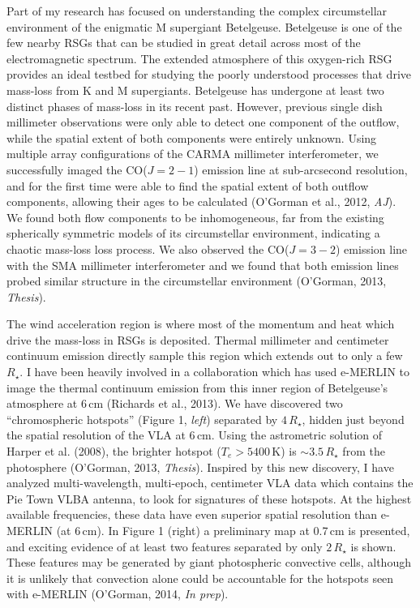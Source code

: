 \documentclass[11pt]{letter} %
\begin{document}
Part of my research has focused on understanding the complex circumstellar environment of the enigmatic M supergiant Betelgeuse. Betelgeuse is one of the few nearby RSGs that can be studied in great detail across most of the electromagnetic spectrum. The extended atmosphere of this oxygen-rich RSG provides an ideal testbed for studying the poorly understood processes that drive mass-loss from K and M supergiants. Betelgeuse has undergone at least two distinct phases of mass-loss in its recent past. However, previous single dish millimeter observations were only able to detect one component of the outflow, while the spatial extent of both components were entirely unknown. Using multiple array configurations of the CARMA millimeter interferometer, we successfully imaged the CO($J = 2 - 1$) emission line at sub-arcsecond resolution, and for the first time were able to find the spatial extent of both outflow components, allowing their ages to be calculated (O'Gorman et al., 2012, \textit{AJ}). We found both flow components to be inhomogeneous, far from the existing spherically symmetric models of its circumstellar environment, indicating a chaotic mass-loss loss process. We also observed  the CO($J = 3 - 2$) emission line with the SMA millimeter interferometer and we found that both emission lines probed similar structure in the circumstellar environment (O'Gorman, 2013, \textit{Thesis}). 

The wind acceleration region is where most of the momentum and heat which drive the mass-loss in RSGs is deposited. Thermal millimeter and centimeter continuum emission directly sample this region which extends out to only a few $R_{\star}$. I have been heavily involved in a collaboration which has used e-MERLIN to image the thermal continuum emission from this inner region of Betelgeuse's atmosphere at 6\,cm (Richards et al., 2013). We have discovered two ``chromospheric hotspots'' (Figure 1, \textit{left}) separated by $4\,R_{\star}$, hidden just beyond the spatial resolution of the VLA at 6\,cm. Using the astrometric solution of Harper et al. (2008), the brighter hotspot ($T_{e} > 5400$\,K) is $\sim 3.5\,R_{\star}$ from the photosphere (O'Gorman, 2013, \textit{Thesis}). Inspired by this new discovery, I have analyzed multi-wavelength, multi-epoch, centimeter VLA data which contains the Pie Town VLBA antenna, to look for signatures of these hotspots. At the highest available frequencies, these data have even superior spatial resolution than e-MERLIN (at 6\,cm).  In Figure 1 (right) a preliminary map at 0.7\,cm is presented, and exciting evidence of at least two features separated by only $2\,R_{\star}$ is shown. These features may be generated by  giant photospheric convective cells, although it is unlikely that convection alone could be accountable for the hotspots seen with e-MERLIN (O'Gorman, 2014, \textit{In prep}).
\end{document}
